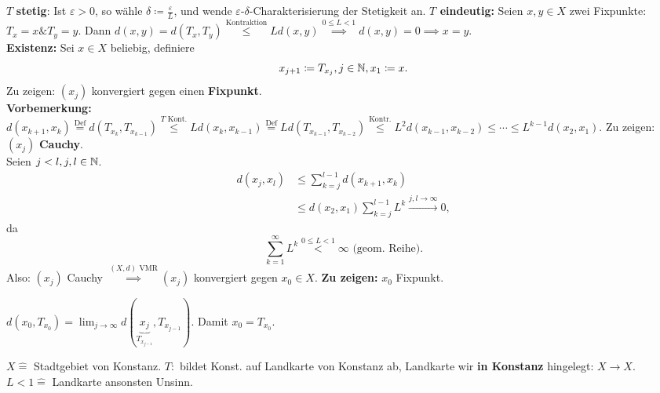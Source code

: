 \begin{subproof*}
	$ T $ \textbf{stetig}: Ist $ \varepsilon > 0 $, so wähle $ \delta \coloneqq \frac{ \varepsilon }{ L }  $, und wende $ \varepsilon $-$ \delta $-Charakterisierung der Stetigkeit an. \textbf{$ T $ eindeutig:} Seien $ x, y \in X $ zwei Fixpunkte: $ T_x = x \& T_y = y $. Dann $ d(x, y) = d(T_x, T_y) \overset{\text{Kontraktion} }{\leq } L d(x, y) \overset{0 \leq L < 1}{\implies } d(x, y) = 0 \implies x = y $.\\
	\textbf{Existenz:} Sei $ x \in X $ beliebig, definiere
	\[
		x_{j+1} \coloneqq T_{x_j} , j \in \mathbb{N} , x_1 \coloneqq x.
	\]
	Zu zeigen: $ (x_j) $ konvergiert gegen einen \textbf{Fixpunkt}.\\
	\textbf{Vorbemerkung:} $ d(x_{k + 1} , x_k) \overset{\text{Def} }{=} d\left(T_{x_k} , T_{x_{k - 1} } \right) \overset{T\text{ Kont.} }{\leq } L d\left( x_k, x_{k - 1}  \right) \overset{\text{Def} }{=} L d\left( T_{x_{k - 1} } , T_{x_{k-2} }  \right) \overset{\text{Kontr.} }{\leq } L^2 d\left( x_{k-1} , x_{k-2}  \right) \leq \dotsb \leq L^{k-1} d(x_2, x_1) $.
	Zu zeigen: $ (x_j) $ \textbf{Cauchy}.\\
	Seien $ j < l, j, l \in \mathbb{N}  $.
	\begin{align*}
		d(x_j, x_l) &\leq \sum_{k=j}^{l - 1} d\left( x_{k + 1} , x_k \right) \\
			    &\leq d(x_2, x_1) \sum_{k=j}^{l - 1} L^{k} \overset{j,l \to \infty}{\longrightarrow} 0,
	\end{align*}
	da
	\[
		\sum_{k=1}^{\infty} L^k \overset{0 \leq L < 1}{<} \infty \text{ (geom. Reihe)} .
	\]
	Also: $ (x_j) $ Cauchy $ \overset{(X, d) \text{ VMR} }{\implies } (x_j) $ konvergiert gegen $ x_0 \in X $.
	\textbf{Zu zeigen:} $ x_0 $ Fixpunkt.

	$ d(x_0, T_{x_0} ) = \lim_{j \to \infty} d(\underbrace{x_j}_{T_{x_{j - 1} } }, T_{x_{j-1} } ) $.
	Damit $ x_0 = T_{x_0}  $.
\end{subproof*}

$ X \hat{=}  $ Stadtgebiet von Konstanz. $ T: $ bildet Konst. auf Landkarte von Konstanz ab, Landkarte wir \textbf{in Konstanz} hingelegt: $ X \to X $. $ L < 1 \hat{=}  $ Landkarte ansonsten Unsinn.

